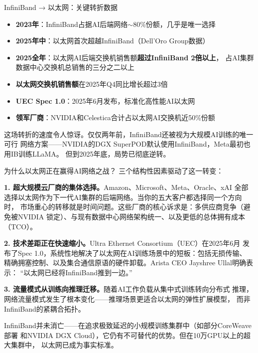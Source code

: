 \begin{keybox}{InfiniBand → 以太网：关键转折数据}
\begin{itemize}
  \item \textbf{2023年}：InfiniBand占据AI后端网络$\sim$80\%份额，几乎是唯一选择
  \item \textbf{2025年中}：以太网首次超越InfiniBand（Dell'Oro Group数据）
  \item \textbf{2025全年}：以太网AI后端交换机销售额\textbf{超过InfiniBand 2倍以上}，
    占AI集群数据中心交换机总销售的三分之二以上
  \item \textbf{以太网交换机销售额}在2025年Q4同比增长超过3倍
  \item \textbf{UEC Spec 1.0}：2025年6月发布，标准化高性能AI以太网
  \item \textbf{领军厂商}：NVIDIA和Celestica合计占以太网AI交换机近50\%份额
\end{itemize}
\end{keybox}

这场转折的速度令人惊讶。仅仅两年前，InfiniBand还被视为大规模AI训练的唯一可行
网络方案——NVIDIA的DGX SuperPOD默认使用InfiniBand，Meta最初也用IB训练LLaMA。
但到2025年底，局势已彻底逆转。

\begin{whybox}{为什么以太网正在赢得AI网络之战？}
三个结构性因素驱动了这一转变：

\textbf{1. 超大规模云厂商的集体选择。}Amazon、Microsoft、Meta、Oracle、xAI
全部选择以太网作为下一代AI集群的后端网络。当你的五大客户都选择同一个方向时，
市场重心的转移就是时间问题。这些厂商的核心诉求是：多供应商竞争（避免被NVIDIA
锁定）、与现有数据中心网络架构统一、以及更低的总体拥有成本（TCO）。

\textbf{2. 技术差距正在快速缩小。}Ultra Ethernet Consortium（UEC）在2025年6月
发布了Spec 1.0，系统性地解决了以太网在AI训练场景中的短板：包括无损传输、
精确拥塞控制、以及集合通信原语的硬件卸载。Arista CEO Jayshree Ullal明确表示：
``以太网已经将InfiniBand推到一边。''

\textbf{3. 流量模式从训练向推理迁移。}随着AI工作负载从集中式训练转向分布式
推理，网络流量模式发生了根本变化——推理场景更适合以太网的弹性扩展模型，
而非InfiniBand的紧耦合拓扑。
\end{whybox}

InfiniBand并未消亡——在追求极致延迟的小规模训练集群中（如部分CoreWeave部署
和NVIDIA DGX Cloud），它仍有不可替代的优势。但在10万GPU以上的超大集群中，
以太网已成为事实标准。


